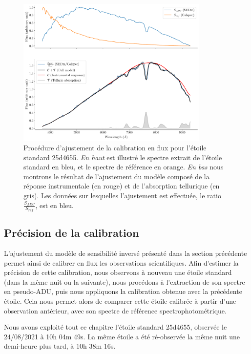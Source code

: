 \documentclass[../main/main.tex]{subfiles}
\begin{document}
\begin{figure}[ht]
  \centering
  \includegraphics[width=0.85\textwidth]{../figures/06_irf/calibmodel.pdf}
  \caption[Procédure d'ajustement de la calibration en flux]{Procédure
    d'ajustement de la calibration en flux pour l'étoile standard
    25d4655. \emph{En haut} est illustré le spectre extrait de l'étoile
    standard en bleu, et le spectre de référence en orange. \emph{En
      bas} nous montrons le résultat de l'ajustement du modèle composé
    de la réponse instrumentale (en rouge) et de l'absorption tellurique
  (en gris). Les données sur lesquelles l'ajustement est effectuée, le
  ratio $\frac{S_{ADU}}{S_{ref}}$, est en bleu.}
  \label{fig:calibmodel}
\end{figure}

\subsection{Précision de la calibration}\label{ssec:resultscalib}

L'ajustement du modèle de sensibilité inversé présenté dans la section
précédente permet ainsi de calibrer en flux les observations
scientifiques. Afin d'estimer la précision de cette calibration, nous
observons à nouveau une étoile standard (dans la même nuit ou la
suivante), nous procédons à l'extraction de son spectre en pseudo-ADU,
puis nous appliquons la calibration obtenue avec la précédente étoile.
Cela nous permet alors de comparer cette étoile calibrée à partir d'une
observation antérieur, avec son spectre de référence
spectrophotométrique.

Nous avons exploité tout ce chapitre l'étoile standard 25d4655, observée
le 24/08/2021 à 10h 04m 49s. La même étoile a été ré-observée la même
nuit une demi-heure plus tard, à 10h 38m 16s.
\end{document}
